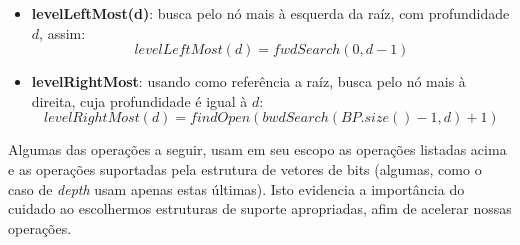 \begin{itemize}
        \item \textbf{levelLeftMost(d)}: busca pelo nó mais à esquerda da raíz, com profundidade $d$, assim:
        $$levelLeftMost(d) = fwdSearch(0,d-1)$$
        
        \item \textbf{levelRightMost}: usando como referência a raíz, busca pelo nó mais à direita, cuja profundidade é igual  à $d$:
        $$levelRightMost(d) = findOpen(bwdSearch(BP.size()-1,d)+1)$$
    \end{itemize}
    
    Algumas das operações a seguir, usam em seu escopo as operações listadas acima e as operações suportadas pela estrutura de vetores de bits (algumas, como o caso de \textit{depth} usam apenas estas últimas). Isto evidencia a importância do cuidado ao escolhermos estruturas de suporte apropriadas, afim de acelerar nossas operações.
